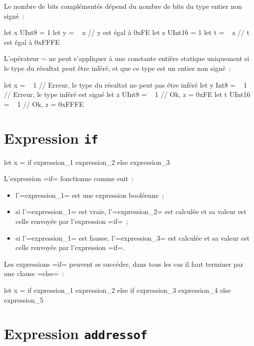 Le nombre de bits complémentés dépend du nombre de bits du type entier non signé~:
\begin{PLM}
let x UInt8 = 1
let y = ~ x // y est égal à 0xFE
let z UInt16 = 1
let t = ~ z // t est égal à 0xFFFE
\end{PLM}

L'opérateur $\sim$ ne peut s'appliquer à une constante entière statique uniquement si le type du résultat peut être inféré, et que ce type est un entier non signé~:
\begin{PLM}
let x = ~ 1 // Erreur, le type du résultat ne peut pas être inféré
let y Int8 = ~ 1 // Erreur, le type inféré est signé
let z UInt8 = ~ 1 // Ok, z = 0xFE
let t UInt16 = ~ 1 // Ok, z = 0xFFFE
\end{PLM}





\section{Expression \texttt{if}}

\begin{PLM}
let x = if expression_1 { expression_2 } else { expression_3 }
\end{PLM}

L'expression \plm=if= fonctionne comme suit~:
\begin{itemize}
  \item l'\plm=expression_1= est une expression booléenne~;
  \item si l'\plm=expression_1= est vraie, l'\plm=expression_2= est calculée et sa valeur est celle renvoyée par l'expression \plm=if=~;
  \item si l'\plm=expression_1= est fausse, l'\plm=expression_3= est calculée et sa valeur est celle renvoyée par l'expression \plm=if=.
\end{itemize}

Les expressions \plm=if= peuvent se succéder, dans tous les cas il faut terminer par une clause \plm=else=~:

\begin{PLM}
let x =
  if expression_1 {
    expression_2
  }else if expression_3 {
    expression_4
  }else{
    expression_5
  }
\end{PLM}



\section{Expression \texttt{addressof}}


